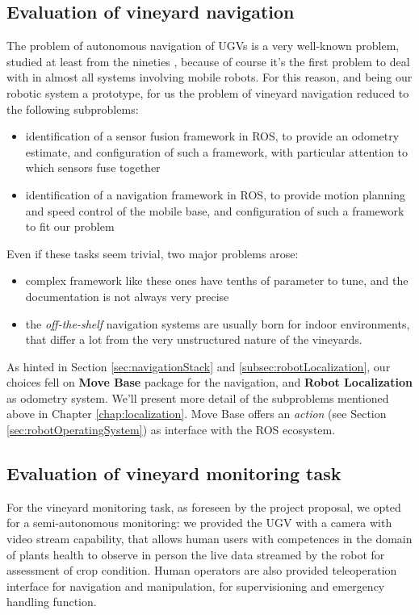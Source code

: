 \subsection{Evaluation of vineyard navigation}
The problem of autonomous navigation of \ac{UGV}s is a very well-known problem, studied at least from the nineties \parencite{storiaUGV}, because of course it's the first problem to deal with in almost all systems involving mobile robots. For this reason, and being our robotic system a prototype, for us the problem of vineyard navigation reduced to the following subproblems:
\begin{itemize}
	\item identification of a sensor fusion framework in \ac{ROS}, to provide an odometry estimate, and configuration of such a framework, with particular attention to which sensors fuse together
	\item identification of a navigation framework in \ac{ROS}, to provide motion planning and speed control of the mobile base, and configuration of such a framework to fit our problem
\end{itemize}
Even if these tasks seem trivial, two major problems arose:
\begin{itemize}
	\item complex framework like these ones have tenths of parameter to tune, and the documentation is not always very precise
	\item the \textit{off-the-shelf} navigation systems are usually born for indoor environments, that differ a lot from the very unstructured nature of the vineyards.
\end{itemize}

As hinted in Section \ref{sec:navigationStack} and \ref{subsec:robotLocalization}, our choices fell on \textbf{Move Base} package for the navigation, and \textbf{Robot Localization} as odometry system. We'll present more detail of the subproblems mentioned above in Chapter \ref{chap:localization}. Move Base offers an \textit{action} (see Section \ref{sec:robotOperatingSystem}) as interface with the \ac{ROS} ecosystem.

\subsection{Evaluation of vineyard monitoring task}
For the vineyard monitoring task, as foreseen by the project proposal, we opted for a semi-autonomous monitoring: we provided the \ac{UGV} with a camera with video stream capability, that allows human users with competences in the domain of plants health to observe in person the live data streamed by the robot for assessment of crop condition. Human operators are also provided teleoperation interface for navigation and manipulation, for supervisioning and emergency handling function.

